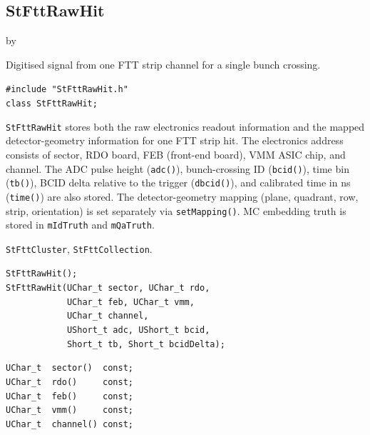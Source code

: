 \documentclass[twoside]{article}
\newcommand{\entrylabel}[1]{\mbox{\textbf{{#1}}}\hfil}%
\newenvironment{entry}
{\begin{list}{}%
    {\renewcommand{\makelabel}{\entrylabel}%
     \setlength{\labelwidth}{90pt}%
     \setlength{\leftmargin}{\labelwidth}
     \advance\leftmargin by \labelsep%
      }%
    }%
  {\end{list}}
\newcommand{\Entrylabel}[1]%
{\raisebox{0pt}[1ex][0pt]{\makebox[\labelwidth][l]%
    {\parbox[t]{\labelwidth}{\hspace{0pt}\textbf{{#1}}}}}}
\newenvironment{Entry}%
{\renewcommand{\entrylabel}{\Entrylabel}\begin{entry}}%
  {\end{entry}}
\begin{document}
\clearpage

\subsection{StFttRawHit}
\label{sec:StFttRawHit}
\begin{Entry}
\item[Summary] Digitised signal from one FTT strip channel for a single bunch crossing.
\item[Synopsis]
    \verb+#include "StFttRawHit.h"+\\
    \verb+class StFttRawHit;+\\
\item[Description]
  \texttt{StFttRawHit} stores both the raw electronics readout information and the mapped
  detector-geometry information for one FTT strip hit.  The electronics address consists
  of sector, RDO board, FEB (front-end board), VMM ASIC chip, and channel.  The ADC
  pulse height (\texttt{adc()}), bunch-crossing ID (\texttt{bcid()}), time bin
  (\texttt{tb()}), BCID delta relative to the trigger (\texttt{dbcid()}), and calibrated
  time in ns (\texttt{time()}) are also stored.  The detector-geometry mapping
  (plane, quadrant, row, strip, orientation) is set separately via \texttt{setMapping()}.
  MC embedding truth is stored in \texttt{mIdTruth} and \texttt{mQaTruth}.
\item[Related Classes]
  \texttt{StFttCluster}, \texttt{StFttCollection}.
\item[Public\\ Constructors]
    \verb+StFttRawHit();+\\
    \verb+StFttRawHit(UChar_t sector, UChar_t rdo,+\\
    \verb+            UChar_t feb, UChar_t vmm,+\\
    \verb+            UChar_t channel,+\\
    \verb+            UShort_t adc, UShort_t bcid,+\\
    \verb+            Short_t tb, Short_t bcidDelta);+\\
\item[Public Member\\ Functions]
    \verb+UChar_t  sector()  const;+\\
    \verb+UChar_t  rdo()     const;+\\
    \verb+UChar_t  feb()     const;+\\
    \verb+UChar_t  vmm()     const;+\\
    \verb+UChar_t  channel() const;+\\

\end{Entry}
\end{document}
